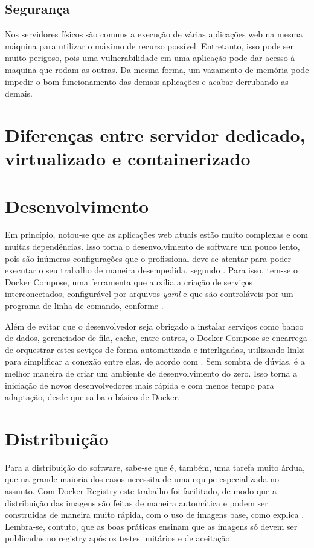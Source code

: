 \documentclass[
	12pt,				%
	openright,			%
	oneside,			%
	a4paper,			%
	chapter=TITLE,		%
	section=TITLE,		%
	english,			%
	french,				%
	spanish,			%
	brazil				%
	]{abntex2}
\begin{document}
\subsection{Segurança}

Nos servidores físicos são comuns a execução de várias aplicações web na mesma máquina para utilizar o máximo de recurso possível. Entretanto, isso pode ser muito perigoso, pois uma vulnerabilidade em uma aplicação pode dar acesso à maquina que rodam as outras. Da mesma forma, um vazamento de memória pode impedir o bom funcionamento das demais aplicações e acabar derrubando as demais.

\section{Diferenças entre servidor dedicado, virtualizado e containerizado}

\section{Desenvolvimento}

Em princípio, notou-se que as aplicações web atuais estão muito complexas e com muitas dependências. Isso torna o desenvolvimento de software um pouco lento, pois são inúmeras configurações que o profissional deve se atentar para poder executar o seu trabalho de maneira desempedida, segundo . Para isso, tem-se o Docker Compose, uma ferramenta que auxilia a criação de serviços interconectados, configurável por arquivos \textit{yaml} e que são controláveis por um programa de linha de comando, conforme .

Além de evitar que o desenvolvedor seja obrigado a instalar serviços como banco de dados, gerenciador de fila, cache, entre outros, o Docker Compose se encarrega de orquestrar estes seviços de forma automatizada e interligadas, utilizando links para simplificar a conexão entre elas, de acordo com . Sem sombra de dúvias, é a melhor maneira de criar um ambiente de desenvolvimento do zero. Isso torna a iniciação de novos desenvolvedores mais rápida e com menos tempo para adaptação, desde que saiba o básico de Docker.

\section{Distribuição}

Para a distribuição do software, sabe-se que é, também, uma tarefa muito árdua, que na grande maioria dos casos necessita de uma equipe especializada no assunto. Com Docker Registry este trabalho foi facilitado, de modo que a distribuição das imagens são feitas de maneira automática e podem ser construídas de maneira muito rápida, com o uso de imagens base, como explica . Lembra-se, contuto, que as boas práticas ensinam que as imagens só devem ser publicadas no registry após os testes unitários e de aceitação.
\end{document}
